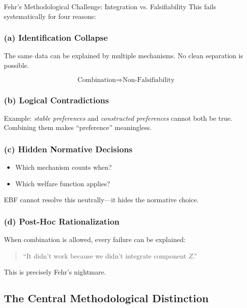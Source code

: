 \begin{chapter}{Fehr's Methodological Challenge: Integration vs. Falsifiability}
This fails systematically for four reasons:

\subsubsection{(a) Identification Collapse}

The same data can be explained by multiple mechanisms.
No clean separation is possible.

\[
\text{Combination} \Rightarrow \text{Non-Falsifiability}
\]

\subsubsection{(b) Logical Contradictions}

Example: \textit{stable preferences} and \textit{constructed preferences} cannot both be true.
Combining them makes ``preference'' meaningless.

\subsubsection{(c) Hidden Normative Decisions}

\begin{itemize}[noitemsep]
    \item Which mechanism counts when?
    \item Which welfare function applies?
\end{itemize}

EBF cannot resolve this neutrally---it hides the normative choice.

\subsubsection{(d) Post-Hoc Rationalization}

When combination is allowed, every failure can be explained:

\begin{quote}
``It didn't work because we didn't integrate component $Z$.''
\end{quote}

This is precisely Fehr's nightmare.

\subsection{The Central Methodological Distinction}


\end{chapter}
